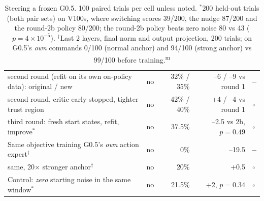 \documentclass[10pt,a4paper]{article}
\DeclareRobustCommand{\meas}{\textsuperscript{\textcolor{green!50!black}{m}}}
\newcommand{\negr}{\textcolor{red!70!black}{\textbf{--}}}
\newcommand{\neu}{\textcolor{gray}{$\circ$}}
\begin{document}
\begin{table}[H]
\begin{tabularx}{\textwidth}{Ylrrl}
\quad second round (refit on its own on-policy data): original / new & no & 32\% / 35\% & --6 / --9 vs round 1 & \negr\\
\quad second round, critic early-stopped, tighter trust region & no & 42\% / 40\% & +4 / --4 vs round 1 & \neu\\
\quad third round: fresh start states, refit, improve$^\ast$ & no & 37.5\% & --2.5 vs 2b, $p=0.49$ & \neu\\
Same objective training G0.5's \emph{own} action expert$^\dagger$ & no & 0\% & --19.5 & \negr\\
\quad same, 20$\times$ stronger anchor$^\dagger$ & no & 20\% & +0.5 & \neu\\
Control: \emph{zero} starting noise in the same window$^\ast$ & no & 21.5\% & +2, $p=0.34$ & \neu\\
\bottomrule
\end{tabularx}
\caption{Steering a frozen G0.5. 100 paired trials per cell unless noted. $^\ast$200 held-out trials (both pair sets) on V100s, where switching scores 39/200, the nudge 87/200 and the round-2b policy 80/200; the round-2b policy beats zero noise 80 vs 43 ($p=4\times10^{-5}$). $^\dagger$Last 2 layers, final norm and output projection, 200 trials; on G0.5's \emph{own} commands 0/100 (normal anchor) and 94/100 (strong anchor) vs 99/100 before training.\meas}
\label{tab:steer}
\end{table}
\end{document}
